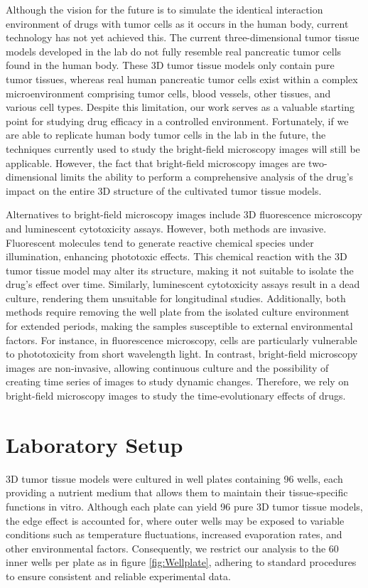 \documentclass[12pt,twoside,a4paper,parskip]{scrbook} %
\begin{document}
Although the vision for the future is to simulate the identical interaction environment of drugs with tumor cells as it occurs in the human body, current technology has not yet achieved this. The current three-dimensional tumor tissue models developed in the lab do not fully resemble real pancreatic tumor cells found in the human body. These 3D tumor tissue models only contain pure tumor tissues, whereas real human pancreatic tumor cells exist within a complex microenvironment comprising tumor cells, blood vessels, other tissues, and various cell types. Despite this limitation, our work serves as a valuable starting point for studying drug efficacy in a controlled environment. Fortunately, if we are able to replicate human body tumor cells in the lab in the future, the techniques currently used to study the bright-field microscopy images will still be applicable. However, the fact that bright-field microscopy images are two-dimensional limits the ability to perform a comprehensive analysis of the drug's impact on the entire 3D structure of the cultivated tumor tissue models.

Alternatives to bright-field microscopy images include 3D fluorescence microscopy and luminescent cytotoxicity assays. However, both methods are invasive. Fluorescent molecules tend to generate reactive chemical species under illumination, enhancing phototoxic effects. This chemical reaction with the 3D tumor tissue model may alter its structure, making it not suitable to isolate the drug's effect over time. Similarly, luminescent cytotoxicity assays result in a dead culture, rendering them unsuitable for longitudinal studies. Additionally, both methods require removing the well plate from the isolated culture environment for extended periods, making the samples susceptible to external environmental factors. For instance, in fluorescence microscopy, cells are particularly vulnerable to phototoxicity from short wavelength light. In contrast, bright-field microscopy images are non-invasive, allowing continuous culture and the possibility of creating time series of images to study dynamic changes. Therefore, we rely on bright-field microscopy images to study the time-evolutionary effects of drugs.

\section{Laboratory Setup}
\label{sec:lab-setup}
3D tumor tissue models were cultured in well plates containing 96 wells, each providing a nutrient medium that allows them to maintain their tissue-specific functions in vitro. Although each plate can yield 96 pure 3D tumor tissue models, the edge effect is accounted for, where outer wells may be exposed to variable conditions such as temperature fluctuations, increased evaporation rates, and other environmental factors. Consequently, we restrict our analysis to the 60 inner wells per plate as in figure \ref{fig:Wellplate}, adhering to standard procedures to ensure consistent and reliable experimental data. 
\end{document}
